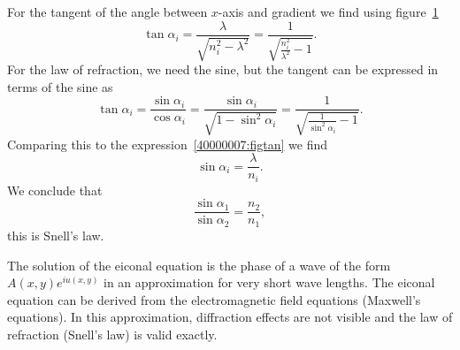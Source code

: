 \begin{loesung}
\begin{teilaufgaben}
\begin{figure}
{\label{40000007:fig}}
\end{figure}
For the tangent of the angle between $x$-axis and gradient we find
using figure~\ref{40000007:fig}
\begin{equation}
\tan\alpha_i
=
\frac{\lambda}{\sqrt{n_i^2-\lambda^2}}
=
\frac1{\sqrt{\frac{n_i^2}{\lambda^2}-1}}.
\label{40000007:figtan}
\end{equation}
For the law of refraction, we need the sine, but the tangent can be
expressed in terms of the sine as
\[
\tan\alpha_i
=
\frac{\sin\alpha_i}{\cos\alpha_i}
=
\frac{\sin\alpha_i}{\sqrt{1-\sin^2\alpha_i}}
=
\frac{1}{\sqrt{\frac{1}{\sin^2\alpha_i}-1}}.
\]
Comparing this to the expression~\eqref{40000007:figtan}
we find
\[
\sin\alpha_i=\frac{\lambda}{n_i}.
\]
We conclude that
\[
\frac{ \sin\alpha_1}{\sin\alpha_2}=\frac{n_2}{n_1},
\]
this is Snell's law.
\qedhere
\end{teilaufgaben}
\end{loesung}

\begin{diskussion}
The solution of the eiconal equation is the phase of a wave of the
form
$A(x,y)e^{iu(x,y)}$ in an approximation for very short wave lengths.
The eiconal equation can be derived from the electromagnetic field
equations (Maxwell's equations).
In this approximation, diffraction effects are not visible and the
law of refraction (Snell's law) is valid exactly.
\end{diskussion}
